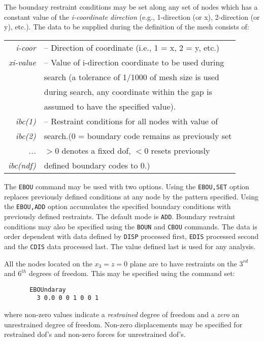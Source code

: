 \\{\smallskip}
 \\{\smallskip}
\headb

The boundary restraint conditions may be set along any
set of nodes which has a constant value of the {\it i-coordinate
direction} (e.g., 1-direction (or x), 2-direction (or y),
etc.).  The data to be supplied during the definition of the
mesh consists of:

\begin{center}
\begin{tabular}{r l}
\it i-coor   &-- Direction of coordinate (i.e., 1 = x, 2 = y, etc.) \\
\it xi-value &-- Value of i-direction coordinate to be used during  \\
             &\quad search (a tolerance of 1/1000 of mesh size is used  \\
             &\quad during search, any coordinate within the gap is  \\
             &\quad assumed to have the specified value).  \\
\it ibc(1)   &-- Restraint conditions for all nodes with value of \\
\it ibc(2)   &\quad search.(0 = boundary code remains as previously set \\
\it ...      &\quad $>0$ denotes a fixed dof, $<0$ resets previously \\
\it ibc(ndf) &\quad defined boundary codes to 0.) \\
\end{tabular}
\end{center}

The {\tt EBOU} command may be used with two options.  Using the {\tt EBOU,SET}
option replaces previously defined conditions at any node by the
pattern specified.  Using the {\tt EBOU,ADD} option
accumulates the specified boundary conditions with previously defined
restraints.  The default mode is {\tt ADD}.
Boundary restraint conditions may also be specified using the {\tt BOUN}
and {\tt CBOU} commands.
The data is order dependent with data
defined by {\tt DISP} processed first, {\tt EDIS} processed second and
the {\tt CDIS} data processed last.  The value defined last is used for
any analysis.


All the nodes located on the $x_3 = z = 0$ plane are to have
restraints on the $3^{rd}$ and $6^{th}$ degrees of freedom.
This may be specified using the command set:
\begin{verbatim}
       EBOUndaray
         3 0.0 0 0 1 0 0 1
\end{verbatim}
where non-zero values indicate a \textit{restrained} degree of freedom and
a \textit{zero} an unrestrained degree of freedom.  Non-zero displacements
may be specified for restrained dof's and non-zero forces for unrestrained
dof's.
\vfil\eject
